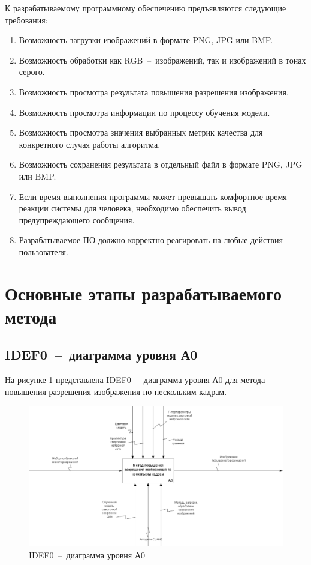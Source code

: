 К разрабатываемому программному обеспечению предъявляются следующие требования:

\begin{enumerate}
    \item Возможность загрузки изображений в формате PNG, JPG или BMP.
    \item Возможность обработки как RGB~--~изображений, так и изображений в тонах серого.
    \item Возможность просмотра результата повышения разрешения изображения.
    \item Возможность просмотра информации по процессу обучения модели.
    \item Возможность просмотра значения выбранных метрик качества для конкретного случая работы алгоритма.
    \item Возможность сохранения результата в отдельный файл в формате PNG, JPG или BMP.
    \item Если время выполнения программы может превышать комфортное время реакции системы для человека, необходимо обеспечить вывод предупреждающего сообщения. 
    \item Разрабатываемое ПО должно корректно реагировать на любые действия пользователя.
\end{enumerate}

\clearpage

\section{Основные этапы разрабатываемого метода}

\subsection{IDEF0~--~диаграмма уровня А0}

На рисунке \ref{idef0-a0} представлена IDEF0~--~диаграмма уровня А0 для метода повышения разрешения изображения по нескольким кадрам.

\begin{figure}[H]
    \centering
    \includegraphics[scale=0.45]{assets/idef0-a0.png}
    \caption{IDEF0~--~диаграмма уровня А0}
    \label{idef0-a0}
\end{figure}

